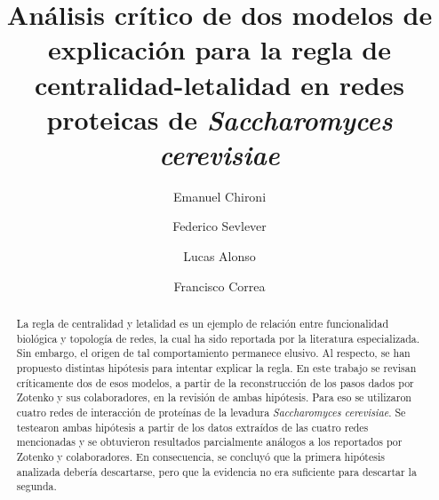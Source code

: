 \documentclass[%
 reprint,
 amsmath,amssymb,
 aps,
]{revtex4-1}
\def \sc {\em Saccharomyces cerevisiae}
\begin{document}

\title{An\'alisis cr\'itico de dos modelos de explicaci\'on para la regla de centralidad-letalidad en redes proteicas de  \sc}%

\author{Emanuel Chironi}
\author{Federico Sevlever}%
\author{Lucas Alonso}
\author{Francisco Correa}
%




\begin{abstract}
La regla de centralidad y letalidad es un ejemplo de relaci\'on entre funcionalidad biol\'ogica y topolog\'ia de redes, la cual ha sido reportada por la literatura especializada. Sin embargo, el origen de tal comportamiento permanece elusivo. Al respecto, se han propuesto distintas hip\'otesis para intentar explicar la regla. En este trabajo se revisan cr\'iticamente dos de esos modelos, a partir de la reconstrucci\'on de los pasos dados por Zotenko y sus colaboradores, en la revisi\'on de ambas hip\'otesis. Para eso se utilizaron cuatro redes de interacci\'on de prote\'inas de la levadura {\sc}. Se testearon ambas hip\'otesis a partir de los datos extra\'idos de las cuatro redes mencionadas y se obtuvieron resultados parcialmente an\'alogos a los reportados por Zotenko y colaboradores. En consecuencia, se concluy\'o que la primera  hip\'otesis analizada deber\'ia descartarse, pero que la evidencia no era suficiente para descartar la segunda.
\end{abstract}

\maketitle
\end{document}
